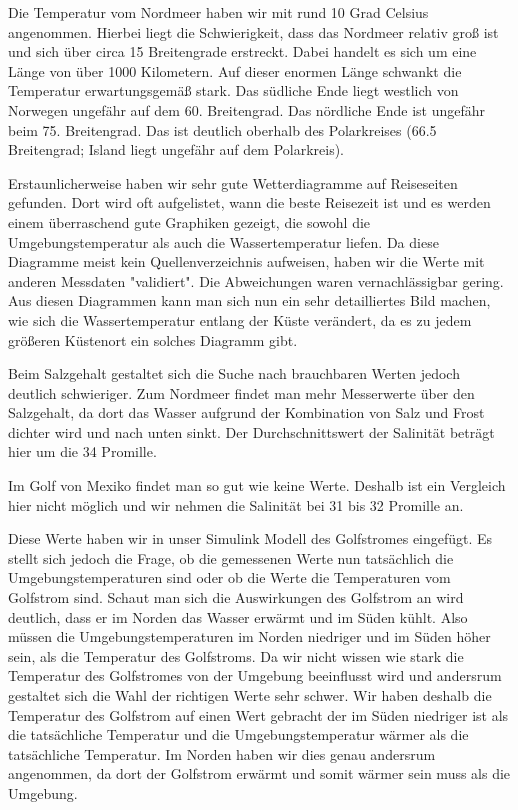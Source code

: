 \documentclass[a4paper,twoside]{article}
\begin{document}
	Die Temperatur vom Nordmeer haben wir mit rund 10 Grad Celsius angenommen. Hierbei liegt die Schwierigkeit, dass das Nordmeer relativ groß ist und sich über circa 15 Breitengrade erstreckt. Dabei handelt es sich um eine Länge von über 1000 Kilometern. Auf dieser enormen Länge schwankt die Temperatur erwartungsgemäß stark. Das südliche Ende liegt westlich von Norwegen ungefähr auf dem 60. Breitengrad. Das nördliche Ende ist ungefähr beim 75. Breitengrad. Das ist deutlich oberhalb des Polarkreises (66.5 Breitengrad; Island liegt ungefähr auf dem Polarkreis).

	Erstaunlicherweise haben wir sehr gute Wetterdiagramme auf Reiseseiten gefunden. Dort wird oft aufgelistet, wann die beste Reisezeit ist und es werden einem überraschend gute Graphiken gezeigt, die sowohl die Umgebungstemperatur als auch die Wassertemperatur liefen. Da diese Diagramme meist kein Quellenverzeichnis aufweisen, haben wir die Werte mit anderen Messdaten "validiert". Die Abweichungen waren vernachlässigbar gering. Aus diesen Diagrammen kann man sich nun ein sehr detailliertes Bild machen, wie sich die Wassertemperatur entlang der Küste verändert, da es zu jedem größeren Küstenort ein solches Diagramm gibt.

	Beim Salzgehalt gestaltet sich die Suche nach brauchbaren Werten jedoch deutlich schwieriger. Zum Nordmeer findet man mehr Messerwerte über den Salzgehalt, da dort das Wasser aufgrund der Kombination von Salz und Frost dichter wird und nach unten sinkt. Der Durchschnittswert der Salinität beträgt hier um die 34 Promille. 

	Im Golf von Mexiko findet man so gut wie keine Werte. Deshalb ist ein Vergleich hier nicht möglich und wir nehmen die Salinität bei 31 bis 32 Promille an.

	Diese Werte haben wir in unser Simulink Modell des Golfstromes eingefügt. Es stellt sich jedoch die Frage, ob die gemessenen Werte nun tatsächlich die Umgebungstemperaturen sind oder ob die Werte die Temperaturen vom Golfstrom sind. Schaut man sich die Auswirkungen des Golfstrom an wird deutlich, dass er im Norden das Wasser erwärmt und im Süden kühlt. Also müssen die Umgebungstemperaturen im Norden niedriger und im Süden höher sein, als die Temperatur des Golfstroms. Da wir nicht wissen wie stark die Temperatur des Golfstromes von der Umgebung beeinflusst wird und andersrum gestaltet sich die Wahl der richtigen Werte sehr schwer. Wir haben deshalb die Temperatur des Golfstrom auf einen Wert gebracht der im Süden niedriger ist als die tatsächliche Temperatur und die Umgebungstemperatur wärmer als die tatsächliche Temperatur. Im Norden haben wir dies genau andersrum angenommen, da dort der Golfstrom erwärmt und somit wärmer sein muss als die Umgebung.
	
\end{document}
